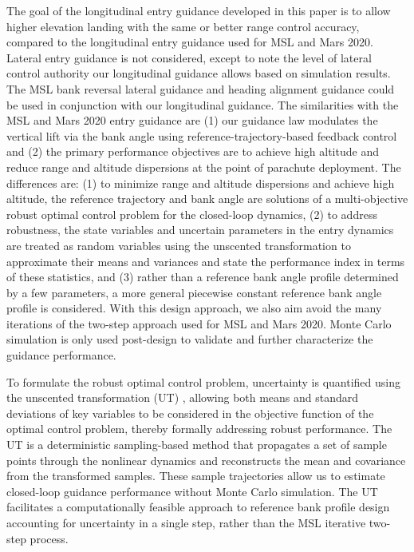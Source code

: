 \documentclass[journal ]{new-aiaa}
\begin{document}
The goal of the longitudinal entry guidance developed in this paper is to allow higher elevation landing with the same or better range control accuracy, compared to the longitudinal entry guidance used for MSL and Mars 2020. Lateral entry guidance is not considered, except to note the level of lateral control authority our longitudinal guidance allows based on simulation results. The MSL bank reversal lateral guidance and heading alignment guidance could be used in conjunction with our longitudinal guidance. The similarities with the MSL and Mars 2020 entry guidance are (1) our guidance law modulates the vertical lift via the bank angle using reference-trajectory-based feedback control and (2) the primary performance objectives are to achieve high altitude and reduce range and altitude dispersions at the point of parachute deployment. The differences are: (1) to minimize range and altitude dispersions and achieve high altitude, the reference trajectory and bank angle are solutions of a multi-objective robust optimal control problem for the closed-loop dynamics, (2) to address robustness, the state variables and uncertain parameters in the entry dynamics are treated as random variables using the unscented transformation to approximate their means and variances and state the performance index in terms of these statistics, and (3) rather than a reference bank angle profile determined by a few parameters, a more general piecewise constant reference bank angle profile is considered. With this design approach, we also aim avoid the many iterations of the two-step approach used for MSL and Mars 2020. Monte Carlo simulation is only used post-design to validate and further characterize the guidance performance.

To formulate the robust optimal control problem, uncertainty is quantified using the unscented transformation (UT) \cite{UT1997}, allowing both means and standard deviations of key variables to be considered in the objective function of the optimal control problem, thereby formally addressing robust performance. The UT is a deterministic sampling-based method that propagates a set of sample points through the nonlinear dynamics and reconstructs the mean and covariance from the transformed samples. These sample trajectories allow us to estimate closed-loop guidance performance without Monte Carlo simulation. The UT facilitates a computationally feasible approach to reference bank profile design accounting for uncertainty in a single step, rather than the MSL iterative two-step process.
\end{document}
